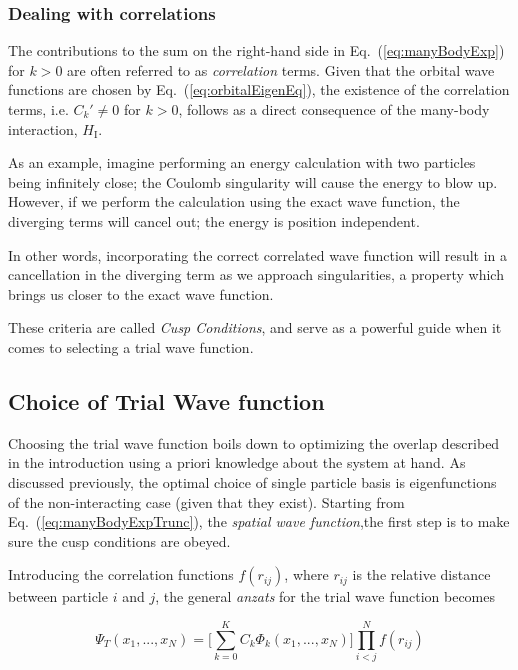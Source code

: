 \subsubsection{Dealing with correlations}

The contributions to the sum on the right-hand side in Eq.~(\ref{eq:manyBodyExp}) for $k>0$ are often referred to as \textit{correlation} terms. Given that the orbital wave functions are chosen by Eq.~(\ref{eq:orbitalEigenEq}), the existence of the correlation terms, i.e. $C_k' \ne 0$ for $k>0$, follows as a direct consequence of the many-body interaction, $H_\mathrm{I}$.

As an example, imagine performing an energy calculation with two particles being infinitely close; the Coulomb singularity will cause the energy to blow up. However, if we perform the calculation using the exact wave function, the diverging terms will cancel out; the energy is position independent. 

In other words, incorporating the correct correlated wave function will result in a cancellation in the diverging term as we approach singularities, a property which brings us closer to the exact wave function. 

These criteria are called \textit{Cusp Conditions}, and serve as a powerful guide when it comes to selecting a trial wave function. 

\subsection{Choice of Trial Wave function}

Choosing the trial wave function boils down to optimizing the overlap described in the introduction using a priori knowledge about the system at hand. As discussed previously, the optimal choice of single particle basis is eigenfunctions of the non-interacting case (given that they exist). Starting from Eq.~(\ref{eq:manyBodyExpTrunc}), the \textit{spatial wave function},the first step is to make sure the cusp conditions are obeyed.

Introducing the correlation functions $f(r_{ij})$, where $r_{ij}$ is the relative distance between particle $i$ and $j$, the general \textit{anzats} for the trial wave function becomes

\begin{equation}
\label{eq:firstAnzatsTWF}
 \Psi_T(x_1, ..., x_N) = \Big[\sum_{k=0}^K C_k\Phi_k(x_1, ..., x_N)\Big]\prod_{i<j}^Nf(r_{ij})
\end{equation}

